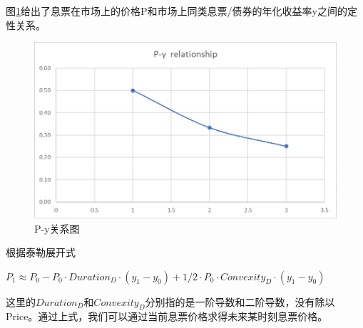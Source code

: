 图\ref{fig:sys.param}给出了息票在市场上的价格P和市场上同类息票/债券的年化收益率y之间的定性关系。

\begin{figure}[htbp]
\begin{center}
\includegraphics[width=16cm]{img//P_y_Relation.PNG}
\caption{P-y关系图}
\label{fig:sys.param}
\end{center}
\end{figure}

根据泰勒展开式

$P_1 \approx P_0-P_0 \cdot {Duration_D} \cdot (y_1-y_0 )+1/2 \cdot {P_0}\cdot {Convexity_D} \cdot (y_1-y_0 )$

这里的$Duration_D$和$Convexity_D$分别指的是一阶导数和二阶导数，没有除以Price。通过上式，我们可以通过当前息票价格求得未来某时刻息票价格。
